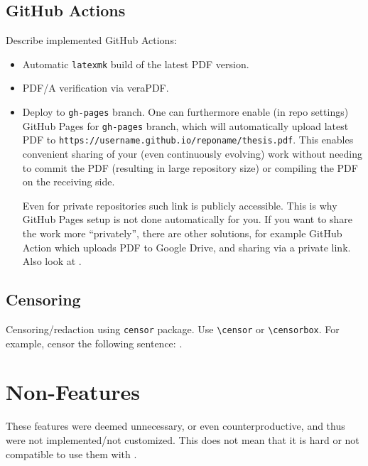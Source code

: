 \subsection{GitHub Actions}%
\label{sub:GitHub Actions}

Describe implemented GitHub Actions:
\begin{itemize}
    \item Automatic \texttt{latexmk} build of the latest PDF version.
    \item PDF/A verification via veraPDF.
    \item Deploy to \texttt{gh-pages} branch.
          One can furthermore enable (in repo settings) GitHub Pages for \texttt{gh-pages} branch, which will automatically upload latest PDF to \texttt{https://username.github.io/reponame/thesis.pdf}.
          This enables convenient sharing of your (even continuously evolving) work without needing to commit the PDF (resulting in large repository size) or compiling the PDF on the receiving side.
          \begin{remark}
              Even for private repositories such link is publicly accessible.
              This is why GitHub Pages setup is not done automatically for you.
              If you want to share the work more \enquote{privately}, there are other solutions, for example GitHub Action which uploads PDF to Google Drive, and sharing via a private link.
              Also look at .
          \end{remark}
\end{itemize}

\subsection{Censoring}%
\label{sub:Censoring}

Censoring/redaction using \texttt{censor} package.
Use \verb|\censor| or \verb|\censorbox|.
For example, censor the following sentence: .


\section{Non-Features}%
\label{sec:Non-Features}

These features were deemed unnecessary, or even counterproductive, and thus were not implemented/not customized.
This does not mean that it is hard or not compatible to use them with \TeXtured{}.

